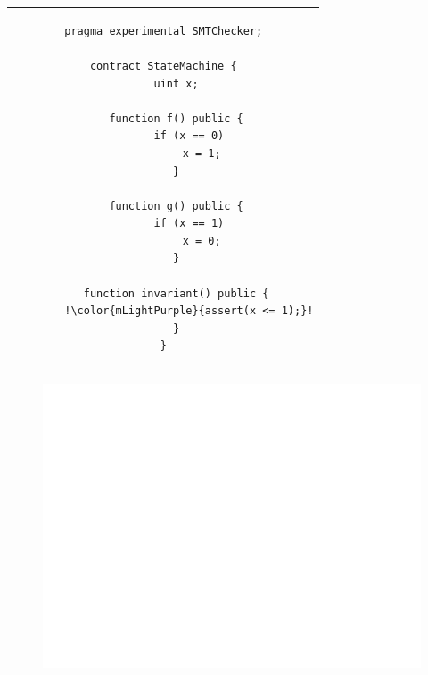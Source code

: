\documentclass[aspectratio=169,10pt]{beamer}
\begin{document}
\begin{frame}[fragile]
\begin{center}
\begin{tabular}{c}
\begin{lstlisting}[basicstyle=\tiny,escapechar=!]
pragma experimental SMTChecker;

contract StateMachine {
    uint x;

    function f() public {
        if (x == 0)
            x = 1;
    }

    function g() public {
        if (x == 1)
            x = 0;
    }

    function invariant() public {
        !\color{mLightPurple}{assert(x <= 1);}!
    }
}
\end{lstlisting}
\end{tabular}
\end{center}
\end{frame}

\begin{frame}[fragile]
\begin{figure}
	\includegraphics[scale=0.3]{images/state_machine}
\end{figure}
\end{frame}
\end{document}
